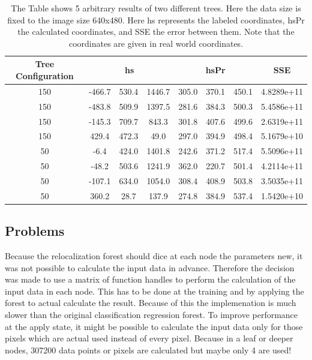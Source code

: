 \begin{table}[p]
\begin{tabular}{|c|c|c|c|c|c|c|c|}
\toprule
Tree Configuration & \multicolumn{3}{|c|}{hs} & \multicolumn{3}{|c|}{hsPr} & SSE \\ \hline
\midrule
150 & -466.7 & 530.4 & 1446.7 & 305.0 & 370.1 & 450.1 & 4.8289e+11  \\ \hline
150 & -483.8 & 509.9 & 1397.5 & 281.6 & 384.3 & 500.3 & 5.4586e+11  \\ \hline
150 & -145.3 & 709.7 & 843.3 & 301.8 & 407.6 & 499.6 & 2.6319e+11  \\ \hline
150 & 429.4 & 472.3 & 49.0 & 297.0 & 394.9 & 498.4 & 5.1679e+10  \\ \hline
50 & -6.4 & 424.0 & 1401.8 & 242.6 & 371.2 & 517.4 & 5.5096e+11  \\ \hline
50 & -48.2 & 503.6 & 1241.9 & 362.0 &  220.7 & 501.4 & 4.2114e+11 \\ \hline
50 & -107.1 & 634.0 & 1054.0 & 308.4 & 408.9 & 503.8 & 3.5035e+11 \\ \hline
50 & 360.2 & 28.7 & 137.9 &  274.8 & 384.9 & 537.4 & 1.5420e+10 \\ \hline
\bottomrule
\end{tabular}
\caption{The Table shows 5 arbitrary results of two different trees. Here the data size is fixed to the image size 640x480. Here hs represents the labeled coordinates, hsPr the calculated coordinates, and SSE the error between them. Note that the coordinates are given in real world coordinates.}
\label{tab:res_reallocation}
\end{table}

\subsection{Problems}

Because the relocalization forest should dice at each node the parameters new, it was not possible to calculate the input data in advance. Therefore the decision was made to use a matrix of function handles to perform the calculation of the input data in each node. This has to be done at the training and by applying the forest to actual calculate the result. Because of this the implemenation is much slower than the original classification regression forest. To improve performance at the apply state, it might be possible to calculate the input data only for those pixels which are actual used instead of every pixel. Because in a leaf or deeper nodes, 307200 data points or pixels are calculated but maybe only 4 are used!

